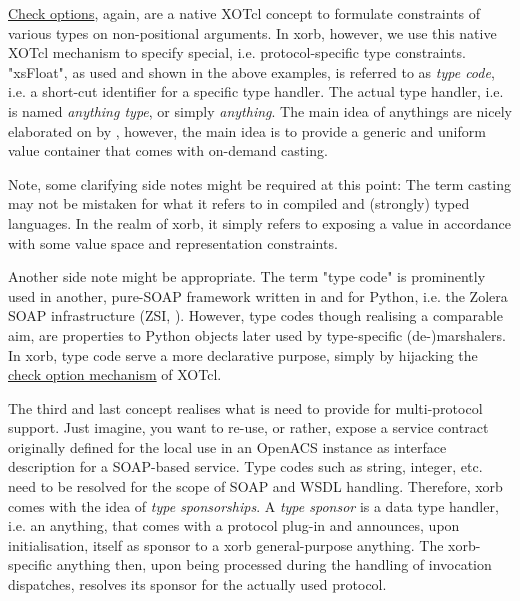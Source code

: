 \href{http://media.wu-wien.ac.at/doc/tutorial.html#non-pos-args}{Check
  options}, again, are a native XOTcl concept to formulate constraints
of various types on non-positional arguments. In xorb, however, we use
this native XOTcl mechanism to specify special, i.e. protocol-specific
type constraints. "xsFloat", as used and shown in the above examples,
is referred to as \emph{type code}, i.e. a short-cut identifier for a
specific type handler. The actual type handler,
i.e.  is named \emph{anything type}, or
simply \emph{anything}. The main idea of anythings are nicely
elaborated on by \cite{sommerlad:1998,maetzel:1996}, however, the main
idea is to provide a generic and uniform value container that comes
with on-demand casting.
\begin{hints}
\item Note, some clarifying side notes might be required at this
  point: The term casting may not be mistaken for what it refers to in
  compiled and (strongly) typed languages. In the realm of xorb, it
  simply refers to exposing a value in accordance with some value space
  and representation constraints.
\item Another side note might be appropriate. The term "type code" is
  prominently used in another, pure-SOAP framework written in and for
  Python, i.e. the Zolera SOAP infrastructure (ZSI,
  \cite{zsi:2007}). However, type codes though realising a comparable
  aim, are properties to Python objects later used by type-specific
  (de-)marshalers. In xorb, type code serve a more declarative purpose,
  simply by hijacking the
  \href{http://media.wu-wien.ac.at/doc/tutorial.html#non-pos-args}{check
    option mechanism} of XOTcl.
\end{hints}
The third and last concept realises what is need to provide for
multi-protocol support. Just imagine, you want to re-use, or rather,
expose a service contract originally defined for the local use in an
OpenACS instance as interface description for a SOAP-based
service. Type codes such as string, integer, etc. need to be resolved
for the scope of SOAP and WSDL handling. Therefore, xorb comes with
the idea of \emph{type sponsorships}. A \emph{type sponsor} is a data
type handler, i.e. an anything, that comes with a protocol plug-in and
announces, upon initialisation, itself as sponsor to a xorb
general-purpose anything. The xorb-specific anything then, upon being
processed during the handling of invocation dispatches, resolves its
sponsor for the actually used protocol.

